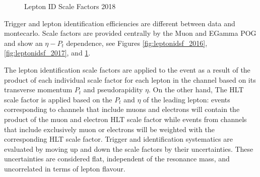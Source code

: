 \begin{figure}[tph]
  \caption{Lepton ID Scale Factors 2018}
  \label{fig:leptonidsf_2018}
\end{figure}

Trigger and lepton identification efficiencies are different between data
and montecarlo. Scale factors are provided centrally by the Muon and EGamma POG
and show an $\eta-P_{t}$ dependence, see Figures \ref{fig:leptonidsf_2016},
\ref{fig:leptonidsf_2017}, and \ref{fig:leptonidsf_2018}.

The lepton identification scale factors are applied to the event
as a result of the product of each individual scale factor for each lepton in
the channel based on its transverse momentum $P_{t}$ and pseudorapidity $\eta$.
On the other hand,
The HLT scale factor is applied based on the $P_{t}$ and $\eta$ of the leading
lepton: events corresponding to channels that include muons and electrons
will contain the product of the muon and electron HLT scale factor while events
from channels that include exclusively muon or electrons will be weighted with
the corresponding HLT scale factor.
Trigger and identification systematics are evaluated by moving up
and down the scale factors by their uncertainties. These uncertainties
are considered flat, independent of the resonance mass, and uncorrelated
in terms of lepton flavour.

